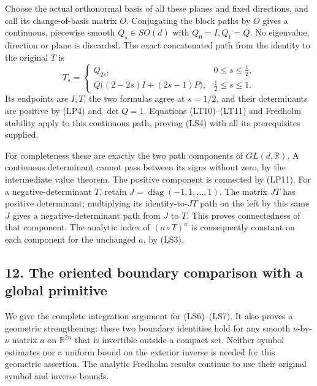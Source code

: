 \documentclass[
  11pt,
]{article}
\begin{document}
Choose the actual orthonormal basis of all these planes and fixed
directions, and call its change-of-basis matrix \(O\). Conjugating the
block paths by \(O\) gives a continuous, piecewise smooth
\(Q_s\in SO(d)\) with \(Q_0=I,Q_1=Q\). No eigenvalue, direction or plane
is discarded. The exact concatenated path from the identity to the
original \(T\) is \[
 T_s=\begin{cases}
       Q_{2s},&0\le s\le\tfrac12,\\
       Q\bigl((2-2s)I+(2s-1)P\bigr),&\tfrac12\le s\le1.
      \end{cases}
 \tag{LP11}
\] Its endpoints are \(I,T\), the two formulas agree at \(s=1/2\), and
their determinants are positive by (LP4) and \(\det Q=1\). Equations
(LT10)--(LT11) and Fredholm stability apply to this continuous path,
proving (LS4) with all its prerequisites supplied.

For completeness these are exactly the two path components of
\(GL(d,\mathbb R)\). A continuous determinant cannot pass between its
signs without zero, by the intermediate value theorem. The positive
component is connected by (LP11). For a negative-determinant \(T\),
retain \(J=\operatorname{diag}(-1,1,\ldots,1)\). The matrix \(JT\) has
positive determinant; multiplying its identity-to-\(JT\) path on the
left by this same \(J\) gives a negative-determinant path from \(J\) to
\(T\). This proves connectedness of that component. The analytic index
of \((a\circ T)^w\) is consequently constant on each component for the
unchanged \(a\), by (LS3).

\subsection{12. The oriented boundary comparison with a global
primitive}\label{the-oriented-boundary-comparison-with-a-global-primitive}

We give the complete integration argument for (LS6)--(LS7). It also
proves a geometric strengthening: these two boundary identities hold for
any smooth \(\nu\)-by-\(\nu\) matrix \(a\) on \(\mathbb R^{2n}\) that is
invertible outside a compact set. Neither symbol estimates nor a uniform
bound on the exterior inverse is needed for this geometric assertion.
The analytic Fredholm results continue to use their original symbol and
inverse bounds.
\end{document}
